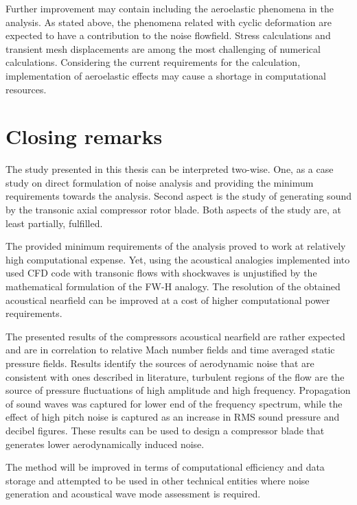 Further improvement may contain including the aeroelastic phenomena in the analysis. As stated above, the phenomena related with cyclic deformation are expected to have a contribution to the noise flowfield. Stress calculations and transient mesh displacements are among the most challenging of numerical calculations. Considering the current requirements for the calculation, implementation of aeroelastic effects may cause a shortage in computational resources.

\section{Closing remarks}
The study presented in this thesis can be interpreted two-wise. One, as a case study on direct formulation of noise analysis and providing the minimum requirements towards the analysis. Second aspect is the study of generating sound by the transonic axial compressor rotor blade. Both aspects of the study are, at least partially, fulfilled.

The provided minimum requirements of the analysis proved to work at relatively high computational expense. Yet, using the acoustical analogies implemented into used CFD code with transonic flows with shockwaves is unjustified by the mathematical formulation of the FW-H analogy. The resolution of the obtained acoustical nearfield can be improved at a cost of higher computational power requirements.

The presented results of the compressors acoustical nearfield are rather expected and are in correlation to relative Mach number fields and time averaged static pressure fields. Results identify the sources of aerodynamic noise that are consistent with ones described in literature, turbulent regions of the flow are the source of pressure fluctuations of high amplitude and high frequency. Propagation of sound waves was captured for lower end of the frequency spectrum, while the effect of high pitch noise is captured as an increase in RMS sound pressure and decibel figures. These results can be used to design a compressor blade that generates lower aerodynamically induced noise.

The method will be improved in terms of computational efficiency and data storage and attempted to be used in other technical entities where noise generation and acoustical wave mode assessment is required.